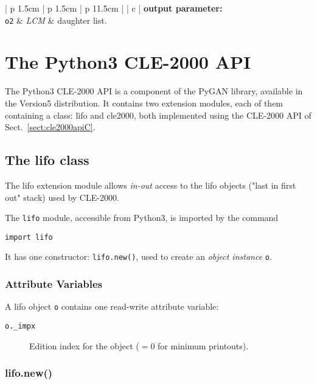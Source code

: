 \vskip 0.8cm

\noindent
\begin{tabular} {| p {1.5cm} | p {1.5cm} | p {11.5cm} |}
\hline
{} {| c |} {\bf output parameter:} \\
\hline
{\tt o2} & {\it LCM} & daughter list. \\
\hline
\end{tabular}

\section{The Python3 CLE-2000 API}

The Python3 CLE-2000 API is a component of the PyGAN library, available in the Version5 distribution. It contains two extension modules, each of them containing a class: {\sc lifo} and {\sc cle2000}, both implemented using the CLE-2000 API of Sect.~\ref{sect:cle2000apiC}. 

\subsection{The lifo class}

The {\sc lifo} extension module allows {\sl in-out} access to the {\sc lifo} objects ("last in first out" stack) used by CLE-2000.

The {\tt lifo} module, accessible from Python3, is imported by the command
\begin{verbatim}
import lifo
\end{verbatim}
It has one constructor: {\tt lifo.new()}, used to create an {\sl object instance} {\tt o}.

\subsubsection{Attribute Variables }

A {\sc lifo} object {\tt o} contains one read-write attribute variable:

\begin {description}
\item [{\tt o.\_impx}] Edition index for the object ($=0$ for minimum printouts).
\end {description}

\subsubsection{lifo.new()}

